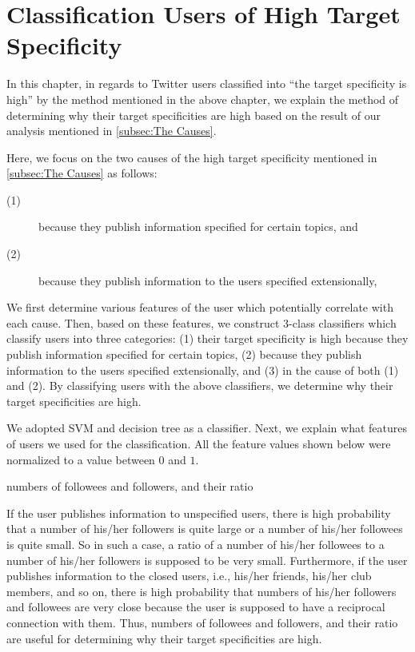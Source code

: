 \section{Classification Users of High Target Specificity}
\label{sec:ClassificationMethod2}

In this chapter, in regards to Twitter users classified into ``the
target specificity is high'' by the method mentioned in the above
chapter, we explain the method of determining why their target
specificities are high based on the result of our analysis mentioned in
\ref{subsec:The Causes}.

Here, we focus on the two causes of the high target specificity
mentioned in \ref{subsec:The Causes} as follows:
\begin{description}
 \item[(1)] because they publish information specified for certain
            topics, and
 \item[(2)] because they publish information to the users specified
            extensionally,
\end{description}


We first determine various features of the user which potentially
correlate with each cause.  Then, based on these features, we construct
3-class classifiers which classify users into three categories: (1)
their target specificity is high because they publish information
specified for certain topics, (2) because they publish information to
the users specified extensionally, and (3) in the cause of both (1) and
(2).  By classifying users with the above classifiers, we determine why
their target specificities are high.

We adopted SVM and decision tree as a classifier.  Next, we explain what
features of users we used for the classification.  All the feature
values shown below were normalized to a value between $0$ and $1$.

\begin{description}
\bf {\item[(i)] numbers of followees and followers, and their ratio}
\end{description}

If the user publishes information to unspecified users, there is high
probability that a number of his/her followers is quite large or a
number of his/her followees is quite small.  So in such a case, a ratio
of a number of his/her followees to a number of his/her followers is
supposed to be very small.  Furthermore, if the user publishes
information to the closed users, i.e., his/her friends, his/her club
members, and so on, there is high probability that numbers of his/her
followers and followees are very close because the user is supposed to
have a reciprocal connection with them.  Thus, numbers of followees and
followers, and their ratio are useful for determining why their target
specificities are high.

